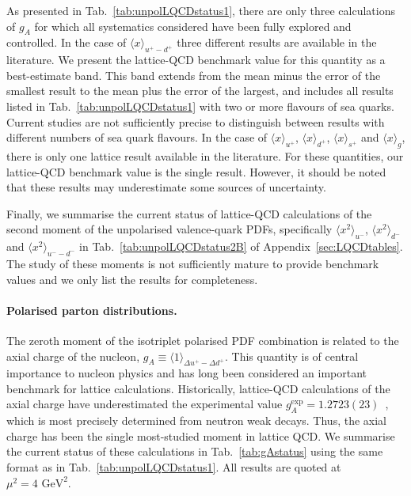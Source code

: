 %
As presented in Tab.~\ref{tab:unpolLQCDstatus1}, 
there are only three 
calculations of $g_A$  for which all systematics considered 
have been fully explored and controlled. 
%
In the case of $\langle x\rangle_{u^+-d^+}$ three different results are available 
in the literature.
%
We present the lattice-QCD benchmark value for this quantity 
as a best-estimate band.
% 
This band extends from the mean minus the error of the smallest result to the 
mean plus the error of the largest, and includes all results listed in 
Tab.~\ref{tab:unpolLQCDstatus1} with two or more flavours of sea quarks.
%
Current studies are not sufficiently precise to distinguish between 
results with different numbers of sea quark flavours.
%
In the case of $\langle x \rangle_{u^+}$, $\langle x \rangle_{d^+}$, 
$\langle x \rangle_{s^+}$ and $\langle x \rangle_g$, there is only one
lattice result available in the literature. 
%
For these quantities, our lattice-QCD benchmark value is the single result.
% 
However, it should be noted that these results may underestimate some sources 
of uncertainty. 

Finally, we summarise the current status of lattice-QCD calculations of the 
second moment of the unpolarised valence-quark PDFs, specifically 
$\langle x^2 \rangle_{u^-}$, $\langle x^2 \rangle_{d^-}$ and $\langle x^2\rangle_{u^--d^-}$
in Tab.~\ref{tab:unpolLQCDstatus2B} of Appendix~\ref{sec:LQCDtables}.
% 
The study of these moments is not sufficiently mature to provide benchmark 
values and we only list the results for completeness.

\paragraph{Polarised parton distributions.}
The zeroth moment of the isotriplet polarised PDF combination is related to the 
axial charge of the nucleon, $g_A\equiv \langle 1\rangle_{\Delta u^+-\Delta d^+}$.
%
This quantity is of central importance to nucleon physics and has long been 
considered an important benchmark for lattice calculations. 
%
Historically, lattice-QCD calculations of the axial charge have underestimated 
the experimental value $g_A^{\mathrm{exp}} = 1.2723(23)$~\cite{Olive:2016xmw}, 
which is most precisely determined from neutron weak decays. 
%
Thus, the axial charge has been the single most-studied moment in lattice QCD.
%
We summarise the current status of these calculations in 
Tab.~\ref{tab:gAstatus} using the same format as in 
Tab.~\ref{tab:unpolLQCDstatus1}.
%
All results are quoted at $\mu^2=4\mbox{ GeV}^2$.

